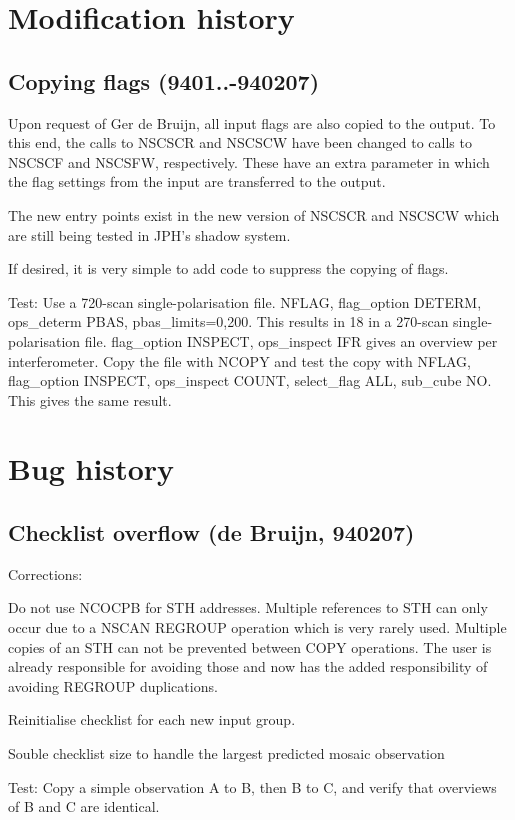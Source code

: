 \section{ Modification history }

\subsection{Copying flags (9401..-940207) }

	Upon request of Ger de Bruijn, all input flags are also copied to the
output. To this end, the calls to NSCSCR and NSCSCW have been changed to calls
to NSCSCF and NSCSFW, respectively. These have an extra parameter in which the
flag settings from the input are transferred to the output.

	The new entry points exist in the new version of NSCSCR and NSCSCW
which are still being tested in JPH's shadow system.

	If desired, it is very simple to add code to suppress the copying of
flags.

	Test:
	Use a 720-scan single-polarisation file. NFLAG, flag\_option DETERM,
ops\_determ PBAS, pbas\_limits=0,200. This results in 18%
in a 270-scan single-polarisation file. flag\_option INSPECT, ops\_inspect IFR
gives an overview per interferometer.
	Copy the file with NCOPY and test the copy with NFLAG, flag\_option
INSPECT, ops\_inspect COUNT, select\_flag ALL, sub\_cube NO. This gives the
same result.


\section{ Bug history }

\subsection{ Checklist overflow (de Bruijn, 940207) }

Corrections:

\bi
\item   Do not use NCOCPB for STH addresses. Multiple references to STH can
only occur due to a NSCAN REGROUP operation which is very rarely used. Multiple
copies of an STH can not be prevented between COPY operations. The user is
already responsible for avoiding those and now has the added responsibility of
avoiding REGROUP duplications.

\item   Reinitialise checklist for each new input group.

\item   Souble checklist size to handle the largest predicted mosaic observation
\ei

Test:
	Copy a simple observation A to B, then B to C, and verify that
overviews of B and C are identical.









